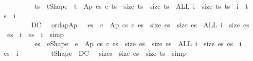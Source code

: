 \documentclass{llncs}
\newenvironment{isacode}
{\begin{list}{}{
\setlength{\leftmargin}{4pt}
\setlength{\rightmargin}{0pt}
\setlength{\listparindent}{0pt}\raggedright
\setlength{\itemsep}{0pt}
\setlength{\parsep}{0pt}
\normalfont\ttfamily }\item[]}
{\end{list}}
\begin{document}
{\begin{isacode}
\ \ \ \ \ \ \ \isamarkupfalse \ \isamarkupfalse \ ts{\isacharprime}\ \ t{\isacharprime}Shape\ {\isacharcolon}\ {\isachardoublequoteopen}{\isacharparenleft}t{\isacharprime}\ {\isacharequal}\ Ap\ {\isacharparenleft}cs\ c{\isacharparenright}\ ts{\isacharprime}{\isacharparenright}\ {\isasymand}\ {\isacharparenleft}size\ ts\ {\isacharequal}\ size\ ts{\isacharprime}{\isacharparenright}\ {\isasymand}\ {\isacharparenleft}ALL\ i\ {\isacharless}\ {\isacharparenleft}size\ ts{\isacharparenright}{\isachardot}\ {\isacharparenleft}ts{\isacharprime}\ {\isacharbang}\ i{\isacharparenright}\ {\isasymsqsubseteq}\ {\isacharparenleft}ts\ {\isacharbang}\ i{\isacharparenright}{\isacharparenright}{\isachardoublequoteclose}\ \isacommand{{\isachardot}{\isachardot}}\isamarkupfalse \isanewline
\ \ \ \ \ \ \ \isamarkupfalse \ DC\ {\isacharparenleft}{}{\isacharparenright}\ \ ordapAp\ \isamarkupfalse \ {\isachardoublequoteopen}{\isasymexists}\ es{\isacharprime}\ {\isachardot}\ {\isacharparenleft}e{\isacharprime}\ {\isacharequal}\ Ap\ {\isacharparenleft}cs\ c{\isacharparenright}\ es{\isacharprime}{\isacharparenright}\ {\isasymand}\ {\isacharparenleft}size\ es\ {\isacharequal}\ size\ es{\isacharprime}{\isacharparenright}\ {\isasymand}\ {\isacharparenleft}ALL\ i\ {\isacharless}\ {\isacharparenleft}size\ es{\isacharparenright}{\isachardot}\ {\isacharparenleft}es\ {\isacharbang}\ i{\isacharparenright}\ {\isasymsqsubseteq}\ {\isacharparenleft}es{\isacharprime}\ {\isacharbang}\ i{\isacharparenright}{\isacharparenright}{\isachardoublequoteclose}\ \isamarkupfalse \ simp\isanewline
\ \ \ \ \ \ \ \isamarkupfalse \ \isamarkupfalse \ es{\isacharprime}\ \ e{\isacharprime}Shape\ {\isacharcolon}\ {\isachardoublequoteopen}{\isacharparenleft}e{\isacharprime}\ {\isacharequal}\ Ap\ {\isacharparenleft}cs\ c{\isacharparenright}\ es{\isacharprime}{\isacharparenright}\ {\isasymand}\ {\isacharparenleft}size\ es\ {\isacharequal}\ size\ es{\isacharprime}{\isacharparenright}\ {\isasymand}\ {\isacharparenleft}ALL\ i\ {\isacharless}\ {\isacharparenleft}size\ es{\isacharparenright}{\isachardot}\ {\isacharparenleft}es\ {\isacharbang}\ i{\isacharparenright}\ {\isasymsqsubseteq}\ {\isacharparenleft}es{\isacharprime}\ {\isacharbang}\ i{\isacharparenright}{\isacharparenright}{\isachardoublequoteclose}\ \isacommand{{\isachardot}{\isachardot}}\isamarkupfalse \isanewline
\ \ \ \ \ \ \ \isamarkupfalse \ t{\isacharprime}Shape\ \ DC\ {\isacharparenleft}{}{\isacharparenright}\ \isamarkupfalse \ size{\isacharprime}s\ {\isacharcolon}\ {\isachardoublequoteopen}size\ es{\isacharprime}\ {\isacharequal}\ size\ ts{\isacharprime}{\isachardoublequoteclose}\ \isamarkupfalse \ simp\isanewline

\end{isacode}}
\end{document}
